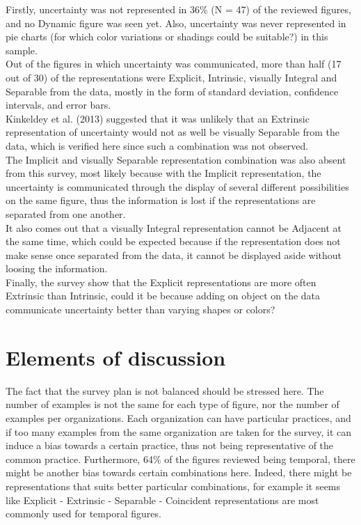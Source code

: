 \documentclass[12pt,a4paper]{article}
\begin{document}
Firstly, uncertainty was not represented in 36\% (N = 47) of the reviewed figures, and
no Dynamic figure was seen yet.
Also, uncertainty was never represented in pie charts (for which color variations or shadings could be suitable?) in this sample.\\
Out of the figures in which uncertainty was communicated, more than half (17 out of 30) of the representations were Explicit, Intrinsic, visually Integral and Separable from the data, mostly in the form of standard deviation, confidence intervals, and error bars.\\
Kinkeldey et al. (2013) suggested that it was unlikely that an Extrinsic representation of uncertainty would not as well be visually Separable from the data, which is verified here since such a combination was not observed.\\
The Implicit and visually Separable representation combination was also absent from this survey, most likely because with the Implicit representation, the uncertainty is communicated through the display of several different possibilities on the same figure, thus the information is lost if the representations are separated from one another.\\
It also comes out that a visually Integral representation cannot be Adjacent at the same time, which could be expected because if the representation does not make sense once separated from the data, it cannot be displayed aside without loosing the information.\\
Finally, the survey show that the Explicit representations are more often Extrinsic than Intrinsic, could it be because adding on object on the data communicate uncertainty better than varying shapes or colors?

\section{Elements of discussion}

The fact that the survey plan is not balanced should be stressed here.
The number of examples is not the same for each type of figure, nor the number of examples per organizations.
Each organization can have particular practices, and if too many examples from the same organization are taken for the survey, it can induce a bias towards a certain practice, thus not being representative of the common practice.
Furthermore, 64\% of the figures reviewed being temporal, there might be another bias towards certain combinations here. 
Indeed, there might be representations that suits better particular combinations, for example it seems like Explicit - Extrinsic - Separable - Coincident representations are most commonly used for temporal figures.
\end{document}
